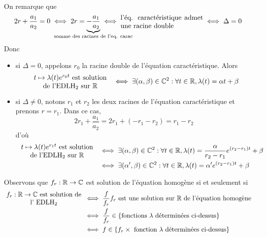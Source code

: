 \documentclass{article}
\begin{document}
\begin{question_kholle}
\begin{align*}
	\end{align*}
	On remarque que
	\[
		2r+\frac{a_{1}}{a_{2}}=0 \iff 2r=\underbrace{-\frac{a_{1}}{a_{2}}}_{\mathclap{\text{somme des racines de l’eq. carac}}} \iff \parbox{12em}{l'éq. caractéristique admet une racine double} \iff \Delta=0
	\]
	Donc
	\begin{itemize}[label=$\star$]
		\item si $\Delta=0$, appelons $r_{0}$ la racine double de l'équation caractéristique. Alors
		      \[
			      \parbox{12em}{\centering$t\mapsto \lambda(t) e^{r_{0}t}$ est solution                                                                                                                                                                                            \\ de l’$\mathrm{EDLH_{2}}$ sur \R} \iff \exists(\alpha, \beta)\in\C^{2}: \forall t\in\R, \lambda(t)=\alpha t + \beta
		      \]
		\item si $\Delta\neq 0$, notons $r_{1}$ et $r_{2}$ les deux racines de l'équation caractéristique et prenons $r=r_{1}$. Dans ce cas,
		      \[
			      2r_{1}+\frac{a_{1}}{a_{2}} = 2r_{1} + (-r_{1}-r_{2}) = r_{1}-r_{2}
		      \]
		      d'où
		      \begin{align*}
			      \parbox{12em}{\centering$t\mapsto \lambda(t) e^{r_{1}t}$ est solution                                    \\ de l’$\mathrm{EDLH_{2}}$ sur \R} & \iff \exists(\alpha, \beta)\in\C^{2}: \forall t\in\R, \lambda(t)=\frac{\alpha}{r_{2}-r_{1}}e^{(r_{2}-r_{1})t}+\beta \\
			       & \iff \exists (\alpha ', \beta)\in\C^{2}: \forall t\in\R, \lambda(t)=\alpha ' e^{(r_{2}-r_{1})t}+\beta
		      \end{align*}
	\end{itemize}
	Observons que $f_{r}:\mathbb R\rightarrow \mathbb C$ est solution de l'équation homogène si et seulement si
	\begin{align*}
		\parbox{12em}{\centering $f_{r}:\R\rightarrow\C$ est solution de l' $\mathrm{EDLH_{2}}$} & \iff	\frac{f}{f_{r}}f_{r} \text{ est une solution sur \R de l'équation homogène}         \\
		                                                                                         & \iff \frac{f}{f_{r}} \in \left\{\text{fonctions $\lambda$ déterminées ci-dessus}\right\} \\
		                                                                                         & \iff f\in \left\{f_{r} \times \text{ fonction $\lambda$ déterminées ci-dessus}\right\}

\end{align*}
\end{question_kholle}
\end{document}

